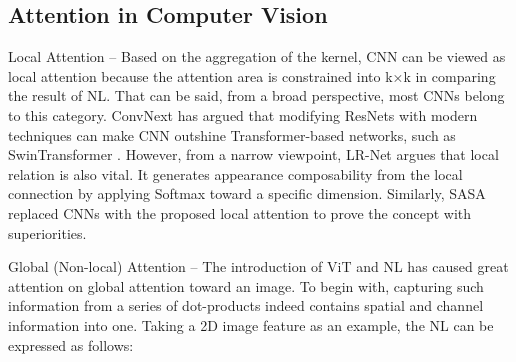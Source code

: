 \documentclass{article}
\begin{document}
\subsection{Attention in Computer Vision}
\label{sec2.3}
Local Attention – Based on the aggregation of the kernel, CNN can be viewed as local attention because the attention area is constrained into k×k in comparing the result of NL. That can be said, from a broad perspective, most CNNs belong to this category. ConvNext \cite{liu2022convnet} has argued that modifying ResNets with modern techniques can make CNN outshine Transformer-based networks, such as SwinTransformer \cite{liu2021swin}. However, from a narrow viewpoint, LR-Net \cite{hu2019local} argues that local relation is also vital. It generates appearance composability from the local connection by applying Softmax toward a specific dimension. Similarly, SASA \cite{ramachandran2019stand} replaced CNNs with the proposed local attention to prove the concept with superiorities. 

Global (Non-local) Attention – The introduction of ViT and NL has caused great attention on global attention toward an image. To begin with, capturing such information from a series of dot-products indeed contains spatial and channel information into one. Taking a 2D image feature  as an example, the NL can be expressed as follows:
\useshortskip
\end{document}

